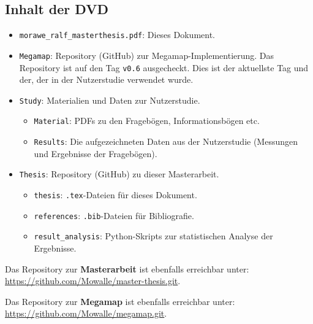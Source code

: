\begin{appendices}
    \chapter{Inhalt der DVD}
    \begin{itemize}
        \item \texttt{morawe\_ralf\_masterthesis.pdf}: Dieses Dokument.
        
        \item \texttt{Megamap}: Repository (GitHub) zur Megamap-Implementierung. %
        Das Repository ist auf den Tag \texttt{v0.6} ausgecheckt. %
        Dies ist der aktuellste Tag und der, der in der Nutzerstudie verwendet wurde.
        
        \item \texttt{Study}: Materialien und Daten zur Nutzerstudie.
        \begin{itemize}
            \item \texttt{Material}: PDFs zu den Fragebögen, Informationsbögen etc.
            
            \item \texttt{Results}: Die aufgezeichneten Daten aus der Nutzerstudie (Messungen und Ergebnisse der Fragebögen).
        \end{itemize}
    
        \item \texttt{Thesis}: Repository (GitHub) zu dieser Masterarbeit.
        \begin{itemize}
            \item \texttt{thesis}: \texttt{.tex}-Dateien für dieses Dokument.
            
            \item \texttt{references}: \texttt{.bib}-Dateien für Bibliografie.
            
            \item \texttt{result\_analysis}: Python-Skripts zur statistischen Analyse der Ergebnisse.
        \end{itemize}
    \end{itemize}
    
    \noindent
    Das Repository zur \textbf{Masterarbeit} ist ebenfalls erreichbar unter:\\
    \url{https://github.com/Mowalle/master-thesis.git}.
    
    \vspace{1em}
    \noindent
    Das Repository zur \textbf{Megamap} ist ebenfalls erreichbar unter:\\
    \url{https://github.com/Mowalle/megamap.git}.
    
    
\end{appendices}
